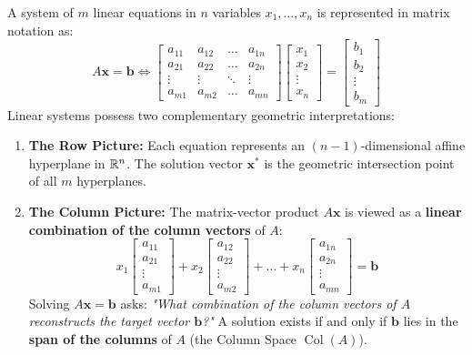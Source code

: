 A system of $m$ linear equations in $n$ variables $x_1, \dots, x_n$ is represented in matrix notation as:
\begin{equation}
A \mathbf{x} = \mathbf{b} \iff \begin{bmatrix} a_{11} & a_{12} & \dots & a_{1n} \\ a_{21} & a_{22} & \dots & a_{2n} \\ \vdots & \vdots & \ddots & \vdots \\ a_{m1} & a_{m2} & \dots & a_{mn} \end{bmatrix} \begin{bmatrix} x_1 \\ x_2 \\ \vdots \\ x_n \end{bmatrix} = \begin{bmatrix} b_1 \\ b_2 \\ \vdots \\ b_m \end{bmatrix}
\end{equation}
Linear systems possess two complementary geometric interpretations:
\begin{enumerate}
    \item \textbf{The Row Picture:} Each equation represents an $(n-1)$-dimensional affine hyperplane in $\mathbb{R}^n$. The solution vector $\mathbf{x}^*$ is the geometric intersection point of all $m$ hyperplanes.
    \item \textbf{The Column Picture:} The matrix-vector product $A\mathbf{x}$ is viewed as a \textbf{linear combination of the column vectors} of $A$:
    \begin{equation}
    x_1 \begin{bmatrix} a_{11} \\ a_{21} \\ \vdots \\ a_{m1} \end{bmatrix} + x_2 \begin{bmatrix} a_{12} \\ a_{22} \\ \vdots \\ a_{m2} \end{bmatrix} + \dots + x_n \begin{bmatrix} a_{1n} \\ a_{2n} \\ \vdots \\ a_{mn} \end{bmatrix} = \mathbf{b}
    \end{equation}
    Solving $A\mathbf{x} = \mathbf{b}$ asks: \textit{"What combination of the column vectors of $A$ reconstructs the target vector $\mathbf{b}$?"} A solution exists if and only if $\mathbf{b}$ lies in the \textbf{span of the columns} of $A$ (the Column Space $\operatorname{Col}(A)$).
\end{enumerate}

